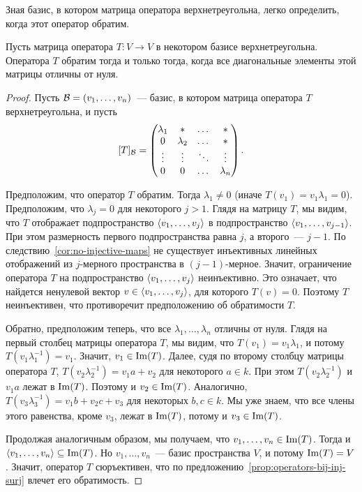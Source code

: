 Зная базис, в котором матрица оператора верхнетреугольна, легко
определить, когда этот оператор обратим.
\begin{proposition}\label{prop:when-ut-is-invertible}
Пусть матрица оператора $T\colon V\to V$ в некотором базисе
верхнетреугольна. Оператора $T$ обратим тогда и только тогда,
когда все диагональные элементы этой матрицы отличны от нуля.
\end{proposition}
\begin{proof}
Пусть $\mathcal B = (v_1,\dots,v_n)$~--- базис, в котором матрица
оператора $T$ верхнетреугольна, и пусть
$$[T]_{\mathcal B} = \begin{pmatrix}
\lambda_1 & * & \dots & * \\
0 & \lambda_2 & \dots & * \\
\vdots & \vdots & \ddots & \vdots \\
0 & 0 & \dots & \lambda_n
\end{pmatrix}.
$$

Предположим, что оператор $T$ обратим. Тогда $\lambda_1\neq 0$
(иначе $T(v_1) = v_1\lambda_1 = 0$). Предположим, что
$\lambda_j = 0$ для некоторого $j>1$. Глядя на матрицу $T$,
мы видим, что $T$ отображает подпространство
$\langle v_1,\dots,v_j\rangle$ в подпространство $\langle v_1,\dots,v_{j-1}\rangle$.
При этом размерность первого подпространства равна $j$,
а второго~--- $j-1$. По следствию~\ref{cor:no-injective-maps}
не существует инъективных линейных отображений из $j$-мерного
пространства в $(j-1)$-мерное. Значит, ограничение оператора $T$
на подпространство $\langle v_1,\dots,v_j\rangle$ неинъективно.
Это означает, что найдется ненулевой вектор $v\in\langle v_1,\dots,v_j\rangle$,
для которого $T(v) = 0$. Поэтому $T$ неинъективен, что противоречит
предположению об обратимости $T$.

Обратно, предположим теперь, что все $\lambda_1,\dots,\lambda_n$
отличны от нуля. Глядя на первый столбец матрицы оператора
$T$, мы видим, что $T(v_1) = v_1\lambda_1$,
и потому $T(v_1\lambda_1^{-1}) = v_1$. Значит, $v_1\in\operatorname{Im}(T)$.
Далее, судя по второму столбцу матрицы оператора $T$,
$T(v_2\lambda_2^{-1}) = v_1 a + v_2$ для некоторого $a\in k$.
При этом $T(v_2\lambda_2^{-1})$ и $v_1a$ лежат в $\operatorname{Im}(T)$.
Поэтому и $v_2\in\operatorname{Im}(T)$.
Аналогично,
$T(v_3\lambda_3^{-1}) = v_1b + v_2c + v_3$ для некоторых
$b,c\in k$. Мы уже знаем, что все члены этого равенства, кроме $v_3$,
лежат в $\operatorname{Im}(T)$, потому и $v_3\in\operatorname{Im}(T)$.

Продолжая аналогичным образом, мы получаем, что
$v_1,\dots,v_n\in\operatorname{Im}(T)$.
Тогда и $\langle v_1,\dots,v_n\rangle\subseteq\operatorname{Im}(T)$. Но $v_1,\dots,v_n$~---
базис пространства $V$, и потому
$\operatorname{Im}(T) = V$. Значит, оператор $T$ сюръективен, что по
предложению~\ref{prop:operators-bij-inj-surj} влечет его обратимость.
\end{proof}

